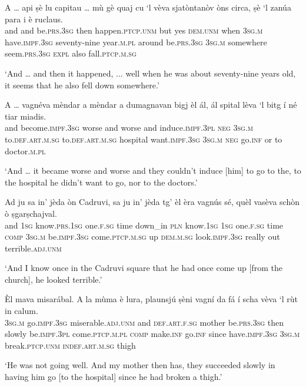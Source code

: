 \begin{linenumbers}
\gll  A … api ṣè lu capitau … mù gè quaj cu `l vèva sjatòntanòv òns circa, ṣè `l zanúa para i è ruclaus.  \\
and {} and be.\textsc{prs.3sg} then happen.\textsc{ptcp.unm} {} but yes \textsc{dem.unm} when \textsc{3sg.m} have.\textsc{impf.3sg} seventy-nine year.\textsc{m.pl} around be.\textsc{prs.3sg} \textsc{3sg.m} somewhere  seem.\textsc{prs.3sg} \textsc{expl} also fall.\textsc{ptcp.m.sg}\\
\end{linenumbers}
\medskip
\glt `And … and then it happened, ... well when he was about seventy-nine years old, it seems that he also fell down somewhere.'
\medskip

\begin{linenumbers}
\gll  A … vagnéva mèndar a mèndar a dumagnavan bigj èl ál, ál spital lèva `l bitg í né tiar miadis.  \\
and {}  become.\textsc{impf.3sg} worse and worse and induce.\textsc{impf.3pl} \textsc{neg} \textsc{3sg.m} to.\textsc{def.art.m.sg} to.\textsc{def.art.m.sg} hospital want.\textsc{impf.3sg} \textsc{3sg.m} \textsc{neg} go.\textsc{inf} or to doctor.\textsc{m.pl} \\
\end{linenumbers}
\medskip
\glt `And … it became worse and worse and they couldn’t induce [him] to go to the, to the hospital he didn’t want to go, nor to the doctors.'
\medskip

\begin{linenumbers}
\gll  Ad ju sa in' jèda òn Cadruvi\footnotemark, sa ju in' jèda tg’ èl èra vagnús sé, quèl vasèva schòn ò ṣgarṣchajval.  \\
and \textsc{1sg} know.\textsc{prs.1sg} one.\textsc{f.sg} time down\_in \textsc{pln} know.\textsc{1sg} \textsc{1sg} one.\textsc{f.sg} time \textsc{comp} \textsc{3sg.m} be.\textsc{impf.3sg} come.\textsc{ptcp.m.sg} up \textsc{dem.m.sg} look.\textsc{impf.3sg} really out terrible.\textsc{adj.unm}\\
\end{linenumbers}
\medskip
\glt `And I know once in the Cadruvi square that he had once come up [from the church], he looked terrible.'
\medskip

\begin{linenumbers}
\gll   Èl mava misarábal. A la mùma è lura, plaunsjú ṣèni vagní da fá í scha vèva `l rùt in calum.\\
 \textsc{3sg.m} go.\textsc{impf.3sg} miserable.\textsc{adj.unm} and \textsc{def.art.f.sg} mother be.\textsc{prs.3sg} then slowly be.\textsc{impf.3pl} come.\textsc{ptcp.m.pl} \textsc{comp} make.\textsc{inf} go.\textsc{inf} since have.\textsc{impf.3sg} \textsc{3sg.m} break.\textsc{ptcp.unm} \textsc{indef.art.m.sg} thigh \\
\end{linenumbers}
\medskip
\glt `He was not going well. And my mother then has, they succeeded slowly in having him go [to the hospital] since he had broken a thigh.'
\medskip

